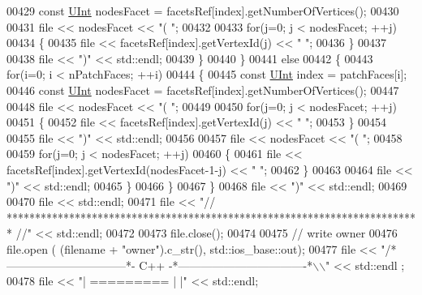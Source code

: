 \begin{DoxyCode}
00429                 \textcolor{keyword}{const} \hyperlink{namespaceFVCode3D_a4bf7e328c75d0fd504050d040ebe9eda}{UInt} nodesFacet = facetsRef[index].getNumberOfVertices();
00430 
00431                 file << nodesFacet << \textcolor{stringliteral}{"( "};
00432 
00433                 \textcolor{keywordflow}{for}(j=0; j < nodesFacet; ++j)
00434                 \{
00435                     file << facetsRef[index].getVertexId(j) << \textcolor{stringliteral}{" "};
00436                 \}
00437 
00438                 file << \textcolor{stringliteral}{")"} << std::endl;
00439             \}
00440         \}
00441         \textcolor{keywordflow}{else}
00442         \{
00443             \textcolor{keywordflow}{for}(i=0; i < nPatchFaces; ++i)
00444             \{
00445                 \textcolor{keyword}{const} \hyperlink{namespaceFVCode3D_a4bf7e328c75d0fd504050d040ebe9eda}{UInt} index = patchFaces[i];
00446                 \textcolor{keyword}{const} \hyperlink{namespaceFVCode3D_a4bf7e328c75d0fd504050d040ebe9eda}{UInt} nodesFacet = facetsRef[index].getNumberOfVertices();
00447 
00448                 file << nodesFacet << \textcolor{stringliteral}{"( "};
00449 
00450                 \textcolor{keywordflow}{for}(j=0; j < nodesFacet; ++j)
00451                 \{
00452                     file << facetsRef[index].getVertexId(j) << \textcolor{stringliteral}{" "};
00453                 \}
00454 
00455                 file << \textcolor{stringliteral}{")"} << std::endl;
00456 
00457                 file << nodesFacet << \textcolor{stringliteral}{"( "};
00458 
00459                 \textcolor{keywordflow}{for}(j=0; j < nodesFacet; ++j)
00460                 \{
00461                     file << facetsRef[index].getVertexId(nodesFacet-1-j) << \textcolor{stringliteral}{" "};
00462                 \}
00463 
00464                 file << \textcolor{stringliteral}{")"} << std::endl;
00465             \}
00466         \}
00467     \}
00468     file << \textcolor{stringliteral}{")"} << std::endl;
00469 
00470     file << std::endl;
00471     file << \textcolor{stringliteral}{"// ************************************************************************* //"} << std::endl;
00472 
00473     file.close();
00474 
00475     \textcolor{comment}{// write owner}
00476     file.open ( (filename + \textcolor{stringliteral}{"owner"}).c\_str(), std::ios\_base::out);
00477     file << \textcolor{stringliteral}{"/*--------------------------------*- C++ -*----------------------------------*\(\backslash\)\(\backslash\)"} << std::endl
      ;
00478     file << \textcolor{stringliteral}{"| =========                 |                                                 |"} << std::endl;

\end{DoxyCode}

